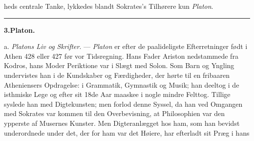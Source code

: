 \documentclass[12pt,a4paper]{book}
\newcommand{\divrule}{\begin{center}\rule{2cm}{0.4pt}\end{center}}
\begin{document}
heds centrale Tanke, lykkedes blandt Sokrates's Tilhørere kun
\emph{Platon}.
\divrule
\begin{center}
\textbf{3.\enspace Platon.}
\end{center}
a. \emph{Platons Liv og Skrifter}. --- \emph{Platon} er efter de
paalideligste Efterretninger født i Athen 428 eller 427 før vor
Tidsregning. Hans Fader Ariston nedstammede fra Kodros,
hans Moder Periktione var i Slægt med Solon. Som Barn og
Yngling undervistes han i de Kundskaber og Færdigheder, der
hørte til en fribaaren Atheniensers Opdragelse: i Grammatik,
Gymnastik og Musik; han deeltog i de isthmiske Lege og efter
sit 18de Aar maaskee i nogle mindre Felttog. Tillige syslede
han med Digtekunsten; men forlod denne Syssel, da han ved
Omgangen med Sokrates var kommen til den Overbevisning,
at Philosophien var den ypperste af Musernes Kunster. Men
Digteranlægget hos ham, som han bevidst underordnede under
det, der for ham var det Høiere, har efterladt sit Præg i hans
\end{document}
